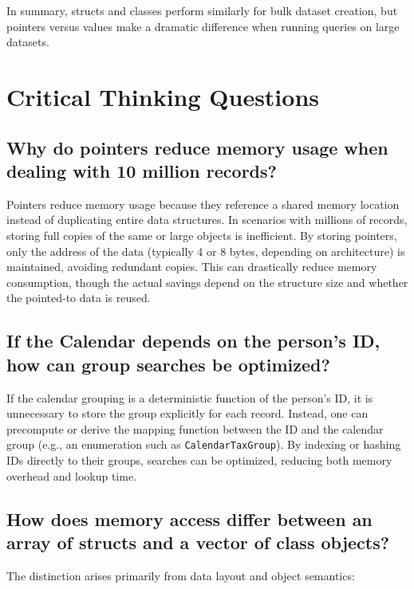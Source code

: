 \documentclass[11pt,letterpaper,oneside]{article}
\begin{document}
In summary, structs and classes perform similarly for bulk dataset creation, but
pointers versus values make a dramatic difference when running queries on large
datasets.


\section{Critical Thinking Questions}

\subsection{Why do pointers reduce memory usage when dealing with 10 million records?}

Pointers reduce memory usage because they reference a shared memory location
instead of duplicating entire data structures. In scenarios with millions of
records, storing full copies of the same or large objects is inefficient. By
storing pointers, only the address of the data (typically 4 or 8 bytes,
depending on architecture) is maintained, avoiding redundant copies. This can
drastically reduce memory consumption, though the actual savings depend on the
structure size and whether the pointed-to data is reused.

\subsection{If the Calendar depends on the person's ID, how can group searches be optimized?}

If the calendar grouping is a deterministic function of the person’s ID, it is
unnecessary to store the group explicitly for each record. Instead, one can
precompute or derive the mapping function between the ID and the calendar group
(e.g., an enumeration such as \texttt{CalendarTaxGroup}). By indexing or hashing
IDs directly to their groups, searches can be optimized, reducing both memory
overhead and lookup time.

\subsection{How does memory access differ between an array of structs and a vector of class objects?}

The distinction arises primarily from data layout and object semantics:
\end{document}

